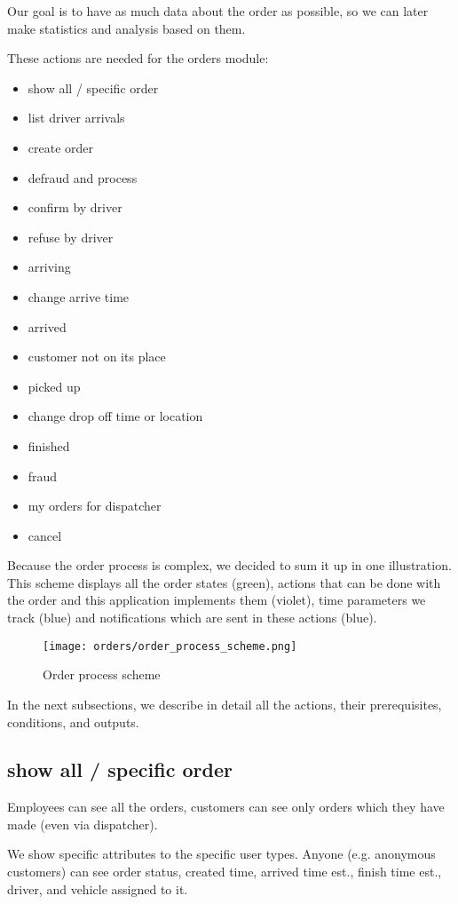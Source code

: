 		Our goal is to have as much data about the order as possible, so we can later make statistics and analysis based on them. 
		
		These actions are needed for the orders module:
		\begin{itemize}
			\item show all / specific order
			\item list driver arrivals
			\item create order
			\item defraud and process
			\item confirm by driver
			\item refuse by driver
			\item arriving
			\item change arrive time
			\item arrived
			\item customer not on its place
			\item picked up
			\item change drop off time or location
			\item finished
			\item fraud
			\item my orders for dispatcher
			\item cancel
		\end{itemize}
		
		Because the order process is complex, we decided to sum it up in one illustration. This scheme displays all the order states (green), actions that can be done with the order and this application implements them (violet), time parameters we track (blue) and notifications which are sent in these actions (blue).
		
		\begin{figure}[H]
			\centering
			\texttt{[image: orders/order\_process\_scheme.png]}
			\caption{Order process scheme}\label{order-process-scheme}
		\end{figure}
	
			In the next subsections, we describe in detail all the actions, their prerequisites, conditions, and outputs.
		
		\subsection{show all / specific order}
			Employees can see all the orders, customers can see only orders which they have made (even via dispatcher).
			
			We show specific attributes to the specific user types. Anyone (e.g. anonymous customers) can see order status, created time, arrived time est., finish time est.,  driver, and vehicle assigned to it. 
			
